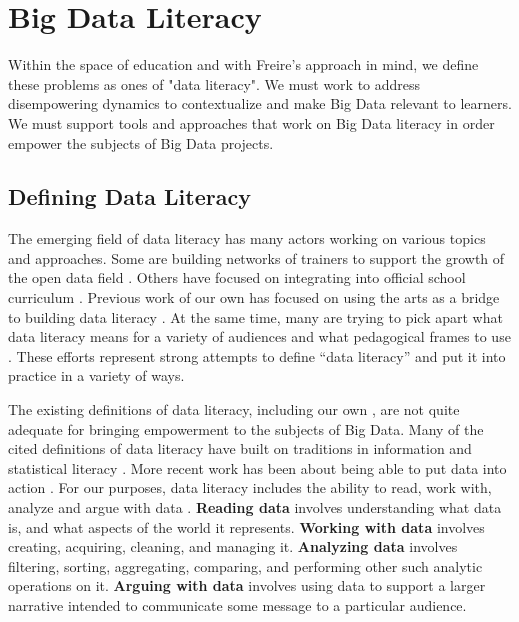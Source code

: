 \documentclass{sig-alternate}
\begin{document}
\section{Big Data Literacy}

Within the space of education and with Freire's approach in mind, we define these problems as ones of "data literacy".  We must work to address disempowering dynamics to contextualize and make Big Data relevant to learners.  We must support tools and approaches that work on Big Data literacy in order empower the subjects of Big Data projects.

\subsection{Defining Data Literacy}

The emerging field of data literacy has many actors working on various topics and approaches.  Some are building networks of trainers to support the growth of the open data field \cite{school_of_data}.  Others have focused on integrating into official school curriculum \cite{hunt_challenges_2004, williams_city_2015, deahl_better_2014}.  Previous work of our own has focused on using the arts as a bridge to building data literacy \cite{bhargava_data_activities}.  At the same time, many are trying to pick apart what data literacy means for a variety of audiences and what pedagogical frames to use \cite{tygel_contributions_2015}.  These efforts represent strong attempts to define “data literacy” and put it into practice in a variety of ways.

The existing definitions of data literacy, including our own \cite{bhargava_data_activities}, are not quite adequate for bringing empowerment to the subjects of Big Data. Many of the cited definitions of data literacy have built on traditions in information and statistical literacy \cite{hunt_challenges_2004,schield_literacy_2004}.  More recent work has been about being able to put data into action \cite{deahl_better_2014}.  For our purposes, data literacy includes the ability to read, work with, analyze and argue with data \cite{bhargava_designing_2015}. \textbf{Reading data} involves understanding what data is, and what aspects of the world it represents. \textbf{Working with data} involves creating, acquiring, cleaning, and managing it. \textbf{Analyzing data} involves filtering, sorting, aggregating, comparing, and performing other such analytic operations on it. \textbf{Arguing with data} involves using data to support a larger narrative intended to communicate some message to a particular audience.
\end{document}
